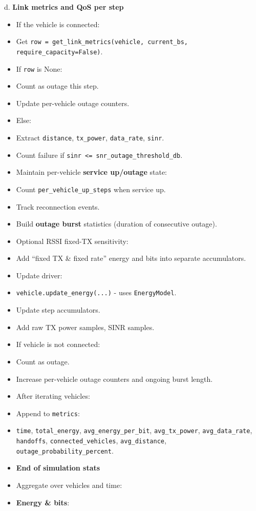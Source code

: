 \documentclass[conference]{IEEEtran}
\begin{document}
       d. \textbf{Link metrics and QoS per step}
\begin{itemize}
\item If the vehicle is connected:
\item Get \texttt{row = get\_link\_metrics(vehicle, current\_bs, require\_capacity=False)}.
\item If \texttt{row} is None:
\item Count as outage this step.
\item Update per-vehicle outage counters.
\item Else:
\item Extract \texttt{distance}, \texttt{tx\_power}, \texttt{data\_rate}, \texttt{sinr}.
\item Count failure if \texttt{sinr <= snr\_outage\_threshold\_db}.
\item Maintain per-vehicle \textbf{service up/outage} state:
\item Count \texttt{per\_vehicle\_up\_steps} when service up.
\item Track reconnection events.
\item Build \textbf{outage burst} statistics (duration of consecutive outage).
\item Optional RSSI fixed-TX sensitivity:
\item Add “fixed TX \& fixed rate” energy and bits into separate accumulators.
\item Update driver:
\item \texttt{vehicle.update\_energy(...)} - uses \texttt{EnergyModel}.
\item Update step accumulators.
\item Add raw TX power samples, SINR samples.
\item If vehicle is not connected:
\item Count as outage.
\item Increase per-vehicle outage counters and ongoing burst length.
\item After iterating vehicles:
\item Append to \texttt{metrics}:
\item \texttt{time}, \texttt{total\_energy}, \texttt{avg\_energy\_per\_bit}, \texttt{avg\_tx\_power}, \texttt{avg\_data\_rate}, \texttt{handoffs}, \texttt{connected\_vehicles}, \texttt{avg\_distance}, \texttt{outage\_probability\_percent}.
\item \textbf{End of simulation stats}
\item Aggregate over vehicles and time:
\item \textbf{Energy \& bits}:

\end{itemize}
\end{document}
